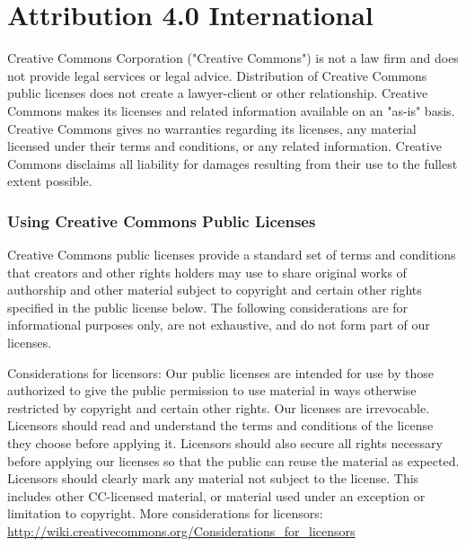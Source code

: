 \chapter{Attribution 4.0 International}
\label{license}

\begin{scriptsize}

Creative Commons Corporation ("Creative Commons") is not a law firm and
does not provide legal services or legal advice. Distribution of
Creative Commons public licenses does not create a lawyer-client or
other relationship. Creative Commons makes its licenses and related
information available on an "as-is" basis. Creative Commons gives no
warranties regarding its licenses, any material licensed under their
terms and conditions, or any related information. Creative Commons
disclaims all liability for damages resulting from their use to the
fullest extent possible.

\subsection*{Using Creative Commons Public Licenses}

Creative Commons public licenses provide a standard set of terms and
conditions that creators and other rights holders may use to share
original works of authorship and other material subject to copyright
and certain other rights specified in the public license below. The
following considerations are for informational purposes only, are not
exhaustive, and do not form part of our licenses.

     Considerations for licensors: Our public licenses are
     intended for use by those authorized to give the public
     permission to use material in ways otherwise restricted by
     copyright and certain other rights. Our licenses are
     irrevocable. Licensors should read and understand the terms
     and conditions of the license they choose before applying it.
     Licensors should also secure all rights necessary before
     applying our licenses so that the public can reuse the
     material as expected. Licensors should clearly mark any
     material not subject to the license. This includes other
	CC-licensed material, or material used under an exception or
     limitation to copyright. More considerations for licensors:
		\url{http://wiki.creativecommons.org/Considerations_for_licensors}


\end{scriptsize}
